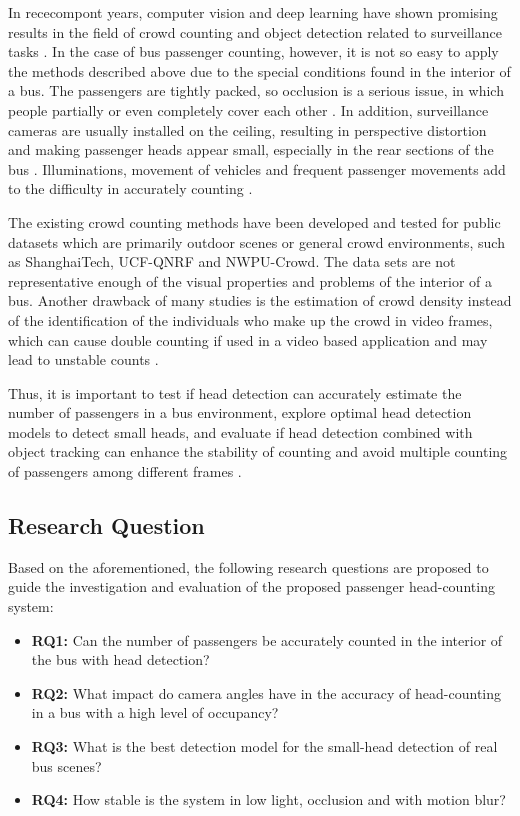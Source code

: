 In rececompont years, computer vision and deep learning have shown promising results in the field of crowd counting and object detection related to surveillance tasks \cite{sindagi2022survey}. In the case of bus passenger counting, however, it is not so easy to apply the methods described above due to the special conditions found in the interior of a bus. The passengers are tightly packed, so occlusion is a serious issue, in which people partially or even completely cover each other \cite{sundararaman2021}. In addition, surveillance cameras are usually installed on the ceiling, resulting in perspective distortion and making passenger heads appear small, especially in the rear sections of the bus \cite{rapid2020}. Illuminations, movement of vehicles and frequent passenger movements add to the difficulty in accurately counting \cite{Claire2021}.

The existing crowd counting methods have been developed and tested for public datasets which are primarily outdoor scenes or general crowd environments, such as ShanghaiTech\cite{Zhu2020}, UCF-QNRF\cite{ucf_qnrf_dataset} and NWPU-Crowd\cite{wang2020nwpu}. The data sets are not representative enough of the visual properties and problems of the interior of a bus. Another drawback of many studies is the estimation of crowd density instead of the identification of the individuals who make up the crowd in video frames, which can cause double counting if used in a video based application and may lead to unstable counts \cite{hassan2023crowd}.

Thus, it is important to test if head detection can accurately estimate the number of passengers in a bus environment, explore optimal head detection models to detect small heads, and evaluate if head detection combined with object tracking can enhance the stability of counting and avoid multiple counting of passengers among different frames \cite{occupancy2026mot}.

\subsection{Research Question}

Based on the aforementioned, the following research questions are proposed to guide the investigation and evaluation of the proposed passenger head-counting system:

\begin{itemize}
    \item \textbf{RQ1:} Can the number of passengers be accurately counted in the interior of the bus with head detection?
    \item \textbf{RQ2:} What impact do camera angles have in the accuracy of head-counting in a bus with a high level of occupancy?
    \item \textbf{RQ3:} What is the best detection model for the small-head detection of real bus scenes?
    \item \textbf{RQ4:} How stable is the system in low light, occlusion and with motion blur?
\end{itemize}


